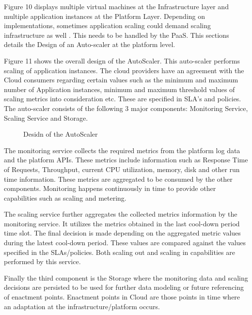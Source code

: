 \documentclass[article,type=msc,colorback,12pt,accentcolor=tud7b]{tudthesis}
\begin{document}
 	Figure 10 displays multiple virtual machines at the Infrastructure layer and multiple application instances at the Platform Layer. Depending on implementations, sometimes application scaling could demand scaling infrastructure as well \cite{cf_scale}. This needs to be handled by the PaaS. This sections details the Design of an Auto-scaler at the platform level. 
		
 	Figure 11 shows the overall design of the AutoScaler. This auto-scaler performs scaling of application instances. The cloud providers have an agreement with the Cloud consumers regarding certain values such as the minimum and maximum number of Application instances, minimum and maximum threshold values of scaling metrics into consideration etc. These are specified in SLA's and policies. The auto-scaler consists of the following 3 major components: Monitoring Service, Scaling Service and Storage.
 	
 	 \begin{figure}[!h]
 	 	\begin{center}
 	 		\makebox[\textwidth]{\texttt{[image: C4]}}
 	 	\end{center}
 	 	\caption{Desidn of the AutoScaler}
 	 \end{figure}
 	
 	The monitoring service collects the required metrics from the platform log data and the platform APIs. These metrics include information such as Response Time of Requests, Throughput, current CPU utilization, memory, disk and other run time information. These metrics are aggregated to be consumed by the other components. Monitoring happens continuously in time to provide other capabilities such as scaling and metering.
 	
 	The scaling service further aggregates the collected metrics information by the monitoring service. It utilizes the metrics obtained in the last cool-down period time slot. The final decision is made depending on the aggregated metric values during the latest cool-down period. These values are compared against the values specified in the SLAs/policies. Both scaling out and scaling in capabilities are performed by this service.
 	
 	Finally the third component is the Storage where the monitoring data and scaling decisions are persisted to be used for further data modeling or future referencing of enactment points. Enactment points in Cloud are those points in time where an adaptation at the infrastructure/platform occurs. 
 	
\end{document}
